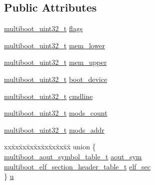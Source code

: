 \subsection*{Public Attributes}
\begin{DoxyCompactItemize}
\item 
\hyperlink{multiboot_8h_a009f355da41fed4badb8a52d432f5186}{multiboot\+\_\+uint32\+\_\+t} \hyperlink{structmultiboot__info_aa562865bc325fd785c9fa4c5056294f3}{flags}
\item 
\hyperlink{multiboot_8h_a009f355da41fed4badb8a52d432f5186}{multiboot\+\_\+uint32\+\_\+t} \hyperlink{structmultiboot__info_aa3503176ee0d132ef98537fa0b36ff09}{mem\+\_\+lower}
\item 
\hyperlink{multiboot_8h_a009f355da41fed4badb8a52d432f5186}{multiboot\+\_\+uint32\+\_\+t} \hyperlink{structmultiboot__info_a87db5803d5a79490b2bf32cb8e9a05c9}{mem\+\_\+upper}
\item 
\hyperlink{multiboot_8h_a009f355da41fed4badb8a52d432f5186}{multiboot\+\_\+uint32\+\_\+t} \hyperlink{structmultiboot__info_ac7dd626a05c9ba62d55ea8a7a254de80}{boot\+\_\+device}
\item 
\hyperlink{multiboot_8h_a009f355da41fed4badb8a52d432f5186}{multiboot\+\_\+uint32\+\_\+t} \hyperlink{structmultiboot__info_a0f2f05f69c69c615bf2b4820d357cf36}{cmdline}
\item 
\hyperlink{multiboot_8h_a009f355da41fed4badb8a52d432f5186}{multiboot\+\_\+uint32\+\_\+t} \hyperlink{structmultiboot__info_aebdafce31f94277d138202f7b1ec35cc}{mods\+\_\+count}
\item 
\hyperlink{multiboot_8h_a009f355da41fed4badb8a52d432f5186}{multiboot\+\_\+uint32\+\_\+t} \hyperlink{structmultiboot__info_a854bdbfa7b23c9c3dfa0bfc155ef8242}{mods\+\_\+addr}
\item 
\begin{tabbing}
xx\=xx\=xx\=xx\=xx\=xx\=xx\=xx\=xx\=\kill
union \{\\
\>\hyperlink{multiboot_8h_a2f11acfde9ee0022a999f69d3e972352}{multiboot\_aout\_symbol\_table\_t} \hyperlink{structmultiboot__info_acf01e96c5d199a398901516df535a5bb}{aout\_sym}\\
\>\hyperlink{multiboot_8h_a2ea4dd45da23724e95b9fc701b41d1e0}{multiboot\_elf\_section\_header\_table\_t} \hyperlink{structmultiboot__info_ab06f895b6b56ca37c8123d145da52387}{elf\_sec}\\
\} \hyperlink{structmultiboot__info_a61dc20144c958a07801f479c74e5867e}{u}\\


\end{tabbing}
\end{DoxyCompactItemize}
